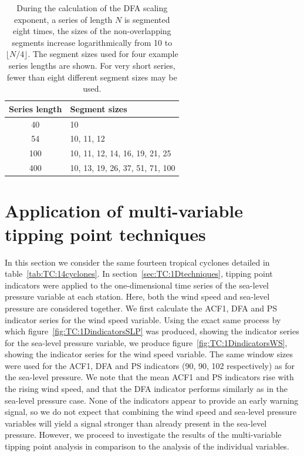 \begin{table}
	\centering
	\begin{tabular}{c l}
		\hline
		Series length & Segment sizes\\
		\hline
		40  & 10\\
		54  & 10, 11, 12\\
		100 & 10, 11, 12, 14, 16, 19, 21, 25\\
		400 & 10, 13, 19, 26, 37, 51, 71, 100\\
		\hline
	\end{tabular}
	
	\caption{During the calculation of the DFA scaling exponent, a series of length $N$ is segmented eight times, the sizes of the non-overlapping segments increase logarithmically from 10 to $\lfloor N/4\rfloor$. The segment sizes used for four example series lengths are shown. For very short series, fewer than eight different segment sizes may be used.}\label{tab:TC:DFAsegmentSizes}
\end{table}



\section{Application of multi-variable tipping point techniques}
\label{sec:TC:2Dtechniques}

In this section we consider the same fourteen tropical cyclones detailed in table~\ref{tab:TC:14cyclones}. In section~\ref{sec:TC:1Dtechniques}, tipping point indicators were applied to the one-dimensional time series of the sea-level pressure variable at each station. Here, both the wind speed and sea-level pressure are considered together. We first calculate the ACF1, DFA and PS indicator series for the wind speed variable. Using the exact same process by which figure~\ref{fig:TC:1DindicatorsSLP} was produced, showing the indicator series for the sea-level pressure variable, we produce figure~\ref{fig:TC:1DindicatorsWS}, showing the indicator series for the wind speed variable. The same window sizes were used for the ACF1, DFA and PS indicators (90, 90, 102 respectively) as for the sea-level pressure. We note that the mean ACF1 and PS indicators rise with the rising wind speed, and that the DFA indicator performs similarly as in the sea-level pressure case. None of the indicators appear to provide an early warning signal, so we do not expect that combining the wind speed and sea-level pressure variables will yield a signal stronger than already present in the sea-level pressure. However, we proceed to investigate the results of the multi-variable tipping point analysis in comparison to the analysis of the individual variables. 

